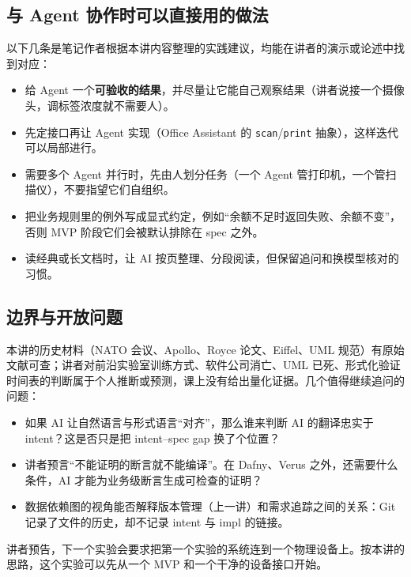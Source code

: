 \documentclass[a4paper]{article}
\begin{document}
\subsection{与 Agent 协作时可以直接用的做法}

以下几条是笔记作者根据本讲内容整理的实践建议，均能在讲者的演示或论述中找到对应：
\begin{itemize}
  \item 给 Agent 一个\textbf{可验收的结果}，并尽量让它能自己观察结果（讲者说接一个摄像头，调标签浓度就不需要人）。
  \item 先定接口再让 Agent 实现（Office Assistant 的 \texttt{scan}/\texttt{print} 抽象），这样迭代可以局部进行。
  \item 需要多个 Agent 并行时，先由人划分任务（一个 Agent 管打印机，一个管扫描仪），不要指望它们自组织。
  \item 把业务规则里的例外写成显式约定，例如“余额不足时返回失败、余额不变”，否则 MVP 阶段它们会被默认排除在 spec 之外。
  \item 读经典或长文档时，让 AI 按页整理、分段阅读，但保留追问和换模型核对的习惯。
\end{itemize}

\subsection{边界与开放问题}

本讲的历史材料（NATO 会议、Apollo、Royce 论文、Eiffel、UML 规范）有原始文献可查；讲者对前沿实验室训练方式、软件公司消亡、UML 已死、形式化验证时间表的判断属于个人推断或预测，课上没有给出量化证据。几个值得继续追问的问题：
\begin{itemize}
  \item 如果 AI 让自然语言与形式语言“对齐”，那么谁来判断 AI 的翻译忠实于 intent？这是否只是把 intent--spec gap 换了个位置？
  \item 讲者预言“不能证明的断言就不能编译”。在 Dafny、Verus 之外，还需要什么条件，AI 才能为业务级断言生成可检查的证明？
  \item 数据依赖图的视角能否解释版本管理（上一讲）和需求追踪之间的关系：Git 记录了文件的历史，却不记录 intent 与 impl 的链接。
\end{itemize}

讲者预告，下一个实验会要求把第一个实验的系统连到一个物理设备上。按本讲的思路，这个实验可以先从一个 MVP 和一个干净的设备接口开始。
\end{document}
